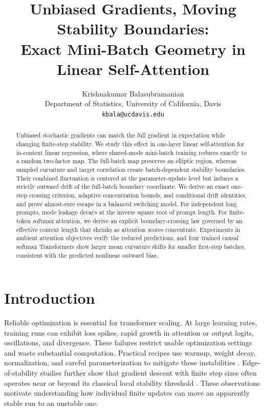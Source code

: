 \documentclass[11pt]{article}
\title{\bf Unbiased Gradients, Moving Stability Boundaries:\\ Exact Mini-Batch Geometry in Linear Self-Attention}
\author{Krishnakumar Balasubramanian\\ Department of Statistics, University of California, Davis\\ \texttt{kbala@ucdavis.edu}}
\date{}
\begin{document}
\maketitle

\begin{abstract}
Unbiased stochastic gradients can match the full gradient in expectation
while changing finite-step stability.  We study this effect in one-layer
linear self-attention for in-context linear regression, where shared-mode
mini-batch training reduces exactly to a random two-factor map.  The
full-batch map preserves an elliptic region, whereas sampled curvature and
target correlation create batch-dependent stability boundaries.  Their
combined fluctuation is centered at the parameter-update level but induces a
strictly outward drift of the full-batch boundary coordinate.  We derive an
exact one-step crossing criterion, adaptive concentration bounds, and
conditional drift identities, and prove almost-sure escape in a balanced
switching model.  For independent long prompts, mode leakage decays at the
inverse square root of prompt length.  For finite-token softmax attention, we
derive an explicit boundary-crossing law governed by an effective context
length that shrinks as attention scores concentrate.  Experiments in ambient
attention objectives verify the reduced predictions, and four trained causal
softmax Transformers show larger mean curvature shifts for smaller
first-step batches, consistent with the predicted nonlinear outward bias.
\end{abstract}

\section{Introduction}
\label{sec:intro}
Reliable optimization is essential for transformer scaling. At large learning rates, training runs can exhibit loss spikes, rapid growth in attention or output logits, oscillations, and divergence. These failures restrict usable optimization settings and waste substantial computation. Practical recipes use warmup, weight decay, normalization, and careful parameterization to mitigate these instabilities \citep{gilmer2022a,wortsman2024small,zhai2023stabilizing}. Edge-of-stability studies further show that gradient descent with finite step sizes often operates near or beyond its classical local stability threshold \citep{cohen2021gradient,arora2022understanding,damian2023self,regis2026rod}. These observations motivate understanding how individual finite updates can move an apparently stable run to an unstable one.
\end{document}
